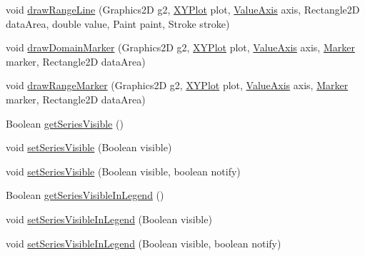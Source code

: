 \begin{DoxyCompactItemize}
\item 
void \mbox{\hyperlink{interfaceorg_1_1jfree_1_1chart_1_1renderer_1_1xy_1_1_x_y_item_renderer_afc254ffe0d44c2b1a40119e14f48f0c7}{draw\+Range\+Line}} (Graphics2D g2, \mbox{\hyperlink{classorg_1_1jfree_1_1chart_1_1plot_1_1_x_y_plot}{X\+Y\+Plot}} plot, \mbox{\hyperlink{classorg_1_1jfree_1_1chart_1_1axis_1_1_value_axis}{Value\+Axis}} axis, Rectangle2D data\+Area, double value, Paint paint, Stroke stroke)
\item 
void \mbox{\hyperlink{interfaceorg_1_1jfree_1_1chart_1_1renderer_1_1xy_1_1_x_y_item_renderer_ad0f14f62760ac243caa4eac54aef934e}{draw\+Domain\+Marker}} (Graphics2D g2, \mbox{\hyperlink{classorg_1_1jfree_1_1chart_1_1plot_1_1_x_y_plot}{X\+Y\+Plot}} plot, \mbox{\hyperlink{classorg_1_1jfree_1_1chart_1_1axis_1_1_value_axis}{Value\+Axis}} axis, \mbox{\hyperlink{classorg_1_1jfree_1_1chart_1_1plot_1_1_marker}{Marker}} marker, Rectangle2D data\+Area)
\item 
void \mbox{\hyperlink{interfaceorg_1_1jfree_1_1chart_1_1renderer_1_1xy_1_1_x_y_item_renderer_a6f5ded461fc90267e38988d442f9303e}{draw\+Range\+Marker}} (Graphics2D g2, \mbox{\hyperlink{classorg_1_1jfree_1_1chart_1_1plot_1_1_x_y_plot}{X\+Y\+Plot}} plot, \mbox{\hyperlink{classorg_1_1jfree_1_1chart_1_1axis_1_1_value_axis}{Value\+Axis}} axis, \mbox{\hyperlink{classorg_1_1jfree_1_1chart_1_1plot_1_1_marker}{Marker}} marker, Rectangle2D data\+Area)
\item 
Boolean \mbox{\hyperlink{interfaceorg_1_1jfree_1_1chart_1_1renderer_1_1xy_1_1_x_y_item_renderer_a03640ef642c53d0ccd4ee5dfd9b49a63}{get\+Series\+Visible}} ()
\item 
void \mbox{\hyperlink{interfaceorg_1_1jfree_1_1chart_1_1renderer_1_1xy_1_1_x_y_item_renderer_a913cfad9e0082e7824942e7fee1a2ad0}{set\+Series\+Visible}} (Boolean visible)
\item 
void \mbox{\hyperlink{interfaceorg_1_1jfree_1_1chart_1_1renderer_1_1xy_1_1_x_y_item_renderer_abbfd4ecf40f8ec2daa278f67b3e20591}{set\+Series\+Visible}} (Boolean visible, boolean notify)
\item 
Boolean \mbox{\hyperlink{interfaceorg_1_1jfree_1_1chart_1_1renderer_1_1xy_1_1_x_y_item_renderer_af24a5321d6c0f46cdca24e0795f90477}{get\+Series\+Visible\+In\+Legend}} ()
\item 
void \mbox{\hyperlink{interfaceorg_1_1jfree_1_1chart_1_1renderer_1_1xy_1_1_x_y_item_renderer_aef7a468d2f9b2345fb206367df781524}{set\+Series\+Visible\+In\+Legend}} (Boolean visible)
\item 
void \mbox{\hyperlink{interfaceorg_1_1jfree_1_1chart_1_1renderer_1_1xy_1_1_x_y_item_renderer_a8cae5bf5b3e5f01e3bc84360b693f9a4}{set\+Series\+Visible\+In\+Legend}} (Boolean visible, boolean notify)

\end{DoxyCompactItemize}
